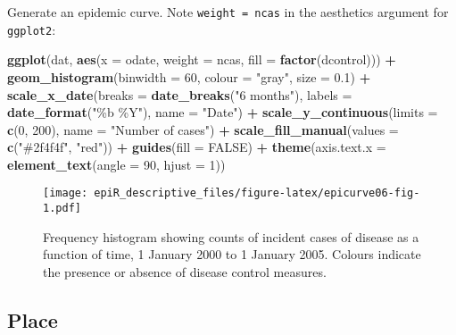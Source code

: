 \documentclass[
]{article}
\newenvironment{Shaded}{\begin{snugshade}}{\end{snugshade}}
\newcommand{\DataTypeTok}[1]{\textcolor[rgb]{0.13,0.29,0.53}{#1}}
\newcommand{\DecValTok}[1]{\textcolor[rgb]{0.00,0.00,0.81}{#1}}
\newcommand{\FloatTok}[1]{\textcolor[rgb]{0.00,0.00,0.81}{#1}}
\newcommand{\KeywordTok}[1]{\textcolor[rgb]{0.13,0.29,0.53}{\textbf{#1}}}
\newcommand{\NormalTok}[1]{#1}
\newcommand{\OperatorTok}[1]{\textcolor[rgb]{0.81,0.36,0.00}{\textbf{#1}}}
\newcommand{\OtherTok}[1]{\textcolor[rgb]{0.56,0.35,0.01}{#1}}
\newcommand{\StringTok}[1]{\textcolor[rgb]{0.31,0.60,0.02}{#1}}
\begin{document}
Generate an epidemic curve. Note \texttt{weight\ =\ ncas} in the
aesthetics argument for \texttt{ggplot2}:

\begin{Shaded}
\begin{Highlighting}[]

\KeywordTok{ggplot}\NormalTok{(dat, }\KeywordTok{aes}\NormalTok{(}\DataTypeTok{x =}\NormalTok{ odate, }\DataTypeTok{weight =}\NormalTok{ ncas, }\DataTypeTok{fill =} \KeywordTok{factor}\NormalTok{(dcontrol))) }\OperatorTok{+}
\StringTok{  }\KeywordTok{geom\_histogram}\NormalTok{(}\DataTypeTok{binwidth =} \DecValTok{60}\NormalTok{, }\DataTypeTok{colour =} \StringTok{"gray"}\NormalTok{, }\DataTypeTok{size =} \FloatTok{0.1}\NormalTok{) }\OperatorTok{+}
\StringTok{  }\KeywordTok{scale\_x\_date}\NormalTok{(}\DataTypeTok{breaks =} \KeywordTok{date\_breaks}\NormalTok{(}\StringTok{"6 months"}\NormalTok{), }\DataTypeTok{labels =} \KeywordTok{date\_format}\NormalTok{(}\StringTok{"\%b \%Y"}\NormalTok{), }
     \DataTypeTok{name =} \StringTok{"Date"}\NormalTok{) }\OperatorTok{+}
\StringTok{  }\KeywordTok{scale\_y\_continuous}\NormalTok{(}\DataTypeTok{limits =} \KeywordTok{c}\NormalTok{(}\DecValTok{0}\NormalTok{, }\DecValTok{200}\NormalTok{), }\DataTypeTok{name =} \StringTok{"Number of cases"}\NormalTok{) }\OperatorTok{+}
\StringTok{  }\KeywordTok{scale\_fill\_manual}\NormalTok{(}\DataTypeTok{values =} \KeywordTok{c}\NormalTok{(}\StringTok{"\#2f4f4f"}\NormalTok{, }\StringTok{"red"}\NormalTok{)) }\OperatorTok{+}\StringTok{ }
\StringTok{  }\KeywordTok{guides}\NormalTok{(}\DataTypeTok{fill =} \OtherTok{FALSE}\NormalTok{) }\OperatorTok{+}
\StringTok{  }\KeywordTok{theme}\NormalTok{(}\DataTypeTok{axis.text.x =} \KeywordTok{element\_text}\NormalTok{(}\DataTypeTok{angle =} \DecValTok{90}\NormalTok{, }\DataTypeTok{hjust =} \DecValTok{1}\NormalTok{))}
\end{Highlighting}
\end{Shaded}

\begin{figure}
\centering
\texttt{[image: epiR\_descriptive\_files/figure-latex/epicurve06-fig-1.pdf]}
\caption{\label{fig:epicurve06}Frequency histogram showing counts of
incident cases of disease as a function of time, 1 January 2000 to 1
January 2005. Colours indicate the presence or absence of disease
control measures.}
\end{figure}

\hypertarget{place}{%
\subsection{Place}\label{place}}
\end{document}
